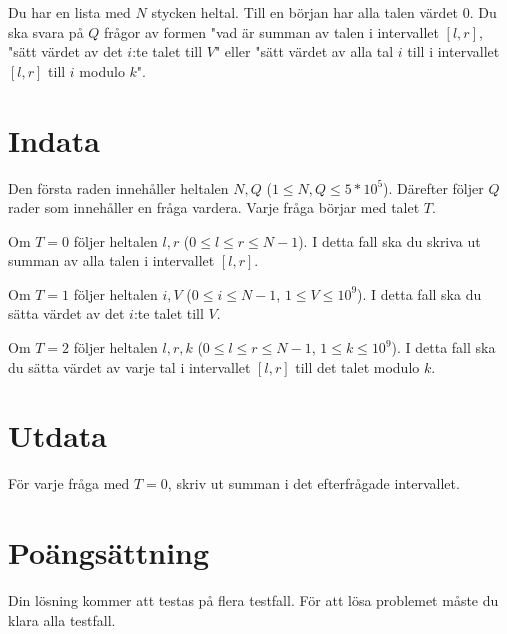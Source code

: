 Du har en lista med $N$ stycken heltal. Till en början har alla talen värdet $0$. Du ska svara på $Q$
frågor av formen "vad är summan av talen i intervallet $[l,r]$,
"sätt värdet av det $i$:te talet till $V$" eller "sätt värdet av alla tal $i$ till i intervallet $[l,r]$
till $i$ modulo $k$".

\section*{Indata}
Den första raden innehåller heltalen $N, Q$ ($1 \leq N, Q \leq 5*10^5$).
Därefter följer $Q$ rader som innehåller en fråga vardera. Varje fråga börjar med talet $T$.

Om $T=0$ följer heltalen $l,r$ ($0 \leq l \leq r \leq N - 1$). I detta fall ska du skriva ut summan av alla talen i intervallet $[l,r]$.

Om $T=1$ följer heltalen $i, V$ ($0 \leq i \leq N - 1$, $1 \leq V \leq 10^9$). I detta fall ska du sätta värdet av det $i$:te talet till $V$.

Om $T=2$ följer heltalen $l,r,k$ ($0 \leq l \leq r \leq N-1$, $1 \leq k \leq 10^9$). I detta fall ska du sätta värdet av varje tal i intervallet $[l,r]$ till det talet modulo $k$.

\section*{Utdata}
För varje fråga med $T=0$, skriv ut summan i det efterfrågade intervallet.

\section*{Poängsättning}
Din lösning kommer att testas på flera testfall.
\noindent
För att lösa problemet måste du klara alla testfall.
